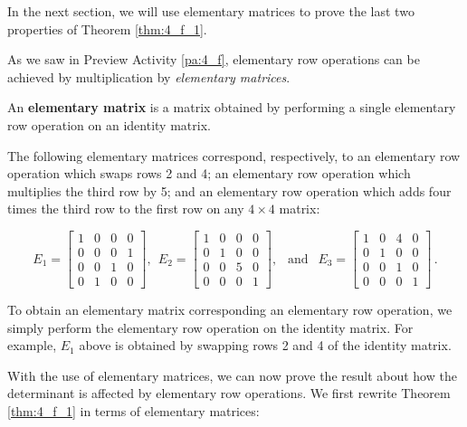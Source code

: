 In the next section, we will use elementary matrices to prove the last two properties of Theorem \ref{thm:4_f_1}. 

\label{sec:mtx_elem}

As we saw in Preview Activity \ref{pa:4_f}, elementary row operations can be achieved by multiplication by \emph{elementary matrices}.

\begin{definition} An \textbf{elementary matrix} is a matrix obtained by performing a single elementary row operation on an identity matrix.
\end{definition}



The following elementary matrices correspond, respectively, to an elementary row operation which swaps rows 2 and 4; an elementary row operation which multiplies the third row by 5; and an elementary row operation which adds four times the third row to the first row on any $4\times 4$ matrix:

\[ E_1 = \left[ \begin{array}{cccc} 1&0&0&0\\0&0&0&1\\0&0&1&0\\ 0&1&0&0 \end{array} \right], \ \ E_2 = \left[ \begin{array}{cccc} 1&0&0&0\\0&1&0&0\\0&0&5&0 \\ 0&0&0&1 \end{array} \right], \ \ \text{ and } \ \ E_3 = \left[ \begin{array}{cccc} 1&0&4&0\\0&1&0&0\\0&0&1&0\\0&0&0&1 \end{array} \right]\,.\]

To obtain an elementary matrix corresponding an elementary row operation, we simply perform the elementary row operation on the identity matrix. For example, $E_1$ above is obtained by swapping rows 2 and 4 of the identity matrix.



With the use of elementary matrices, we can now prove the result about how the determinant is affected by elementary row operations. We first rewrite Theorem \ref{thm:4_f_1} in terms of elementary matrices:

